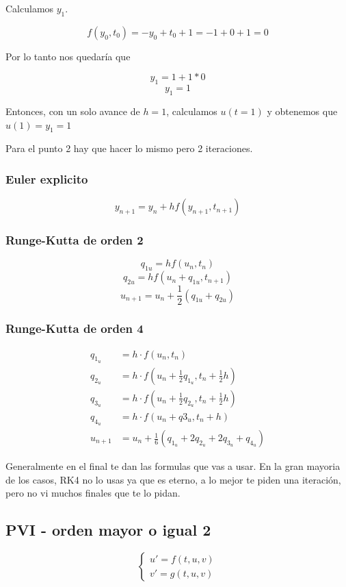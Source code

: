 Calculamos $y_1$. 

$$
f(y_0, t_0) = -y_0+ t_0 + 1 = -1 + 0 + 1 = 0 
$$

Por lo tanto nos quedaría que

$$y_1 = 1 + 1*0 $$
$$y_1 = 1  $$

Entonces, con un solo avance de $h = 1$, calculamos $u(t = 1)$ y obtenemos que $u(1) = y_1 = 1$

Para el punto 2 hay que hacer lo mismo pero 2 iteraciones.
\subsubsection{Euler explicito}
$$
    y_{n+1} = y_n + h  f(y_{n + 1}, t_{n + 1})
$$
\subsubsection{Runge-Kutta de orden 2 }
$$
    q_{1u} = h  f(u_{n}, t_{n})
$$
$$
    q_{2u} = h  f(u_{n} + q_{1u}, t_{n + 1})
$$
$$
    u_{n+1} = u_n + \frac{1}{2}  (q_{1u} + q_{2u})
$$
\subsubsection{Runge-Kutta de orden 4}
\begin{align*}
q_{1_u} &= h \cdot f(u_n, t_n) \\
q_{2_u} &= h \cdot f\left(u_n + \frac{1}{2} q_{1_u}, t_n + \frac{1}{2} h\right) \\
q_{3_u} &= h \cdot f\left(u_n + \frac{1}{2} q_{2_u}, t_n + \frac{1}{2} h\right) \\
q_{4_u} &= h \cdot f\left(u_n + q3_u, t_n + h\right) \\
u_{n+1} &= u_n + \frac{1}{6} \left(q_{1_u} + 2q_{2_u} + 2q_{3_u} + q_{4_u}\right)
\end{align*}



Generalmente en el final te dan las formulas que vas a usar. En la gran mayoria de los casos, RK4 no lo usas ya que es eterno, a lo mejor te piden una iteración, pero no vi muchos finales que te lo pidan.

\subsection{PVI - orden mayor o igual 2 }

\begin{equation}
\left\{
\begin{array}{l}
u' = f(t,u,v) \\
v' = g(t,u,v)
\end{array}
\right.
\end{equation}

